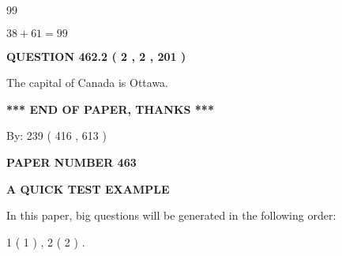 \documentclass[12pt]{article}
\begin{document}
99
 
 
 
 
\noindent{}

$ %
38 +  %
61=   %
99$
 
 
  
\vspace{0.2in}
  
{\textbf{\Large{QUESTION
462.2 
 ( 2 , 2 , 201 )
}}}
  
  
 
 
\noindent{}
 
 
The capital of Canada is Ottawa.
 
 
 
 
   
   
 \vspace{0.2in}
 
   
   
   
   
\vspace{1.0in} 
{\textbf{\large{ *** END OF PAPER, THANKS *** }}} 
   
   
\hspace{1.0in} By: 
 239 ( 416 ,  613 )
   
   
   
   
\newpage 
\setcounter{page}{ 
   463001 } 
   
   
   
   
 {\textbf{ \Large{ PAPER NUMBER  463  }}}
   
   
\vspace{0.2in}
   
   
   
   
   
   
 \vspace{0.2in}
{\LARGE {\textbf{ A QUICK TEST EXAMPLE}}}
   
   
   
\vspace{0.2in}
   
In this paper, big questions will be generated in the following order: 
   
   
   1 ( 1 )
 ,
   2 ( 2 )
 .
  
\vspace{0.2in}
  
\end{document}
